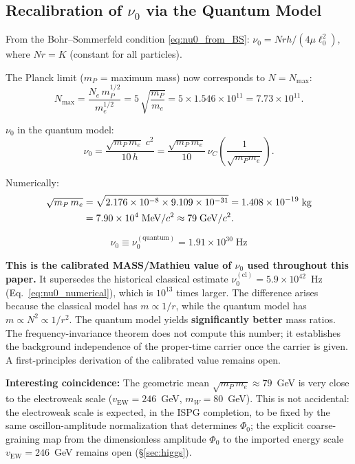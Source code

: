 \documentclass[11pt]{article}
\begin{document}
\subsection{Recalibration of $\nu_0$ via the Quantum Model}

From the Bohr--Sommerfeld condition
\eqref{eq:nu0_from_BS}: $\nu_0 = Nrh/(4\mu\ell_0^2)$,
where $Nr = K$ (constant for all particles).

The Planck limit ($m_P$ = maximum mass) now corresponds to
$N = N_{\max}$:
\begin{equation}
  N_{\max} = \frac{N_e\,m_P^{1/2}}{m_e^{1/2}}
  = 5\,\sqrt{\frac{m_P}{m_e}}
  = 5 \times 1.546 \times 10^{11}
  = 7.73 \times 10^{11}.
\end{equation}

$\nu_0$ in the quantum model:
\begin{equation}
  \nu_0
  = \frac{\sqrt{m_P\,m_e}\;c^2}{10\,h}
  = \frac{\sqrt{m_P\,m_e}}{10}\,\nu_C\!\left(
  \frac{1}{\sqrt{m_P m_e}}\right).
  \label{eq:nu0_quantum}
\end{equation}

Numerically:
\begin{align}
  \sqrt{m_P\,m_e}
  &= \sqrt{2.176 \times 10^{-8}
    \times 9.109 \times 10^{-31}}
  = 1.408 \times 10^{-19}\;\text{kg}
  \notag\\
  &= 7.90 \times 10^{4}\;\text{MeV}/c^2
  \approx 79\;\text{GeV}/c^2.
  \label{eq:geometric_mean_mass}
\end{align}

\begin{equation}
  \boxed{\nu_0
  \equiv \nu_0^{(\mathrm{quantum})}
  = 1.91 \times 10^{30}\;\mathrm{Hz}}
  \label{eq:nu0_quantum_value}
\end{equation}

\textbf{This is the calibrated MASS/Mathieu value of $\nu_0$ used
throughout this paper.}  It supersedes the historical classical
estimate $\nu_0^{(\mathrm{cl})} = 5.9 \times 10^{42}$~Hz
(Eq.~\ref{eq:nu0_numerical}), which is $10^{13}$ times
larger.  The difference arises because
the classical model has $m \propto 1/r$, while the quantum
model has $m \propto N^2 \propto 1/r^2$. The quantum model
yields \textbf{significantly better} mass ratios.  The
frequency-invariance theorem does not compute this number; it
establishes the background independence of the proper-time carrier
once the carrier is given.  A first-principles derivation of the
calibrated value remains open.

\medskip
\textbf{Interesting coincidence:}
The geometric mean $\sqrt{m_P\,m_e}
\approx 79$~GeV is very close to the electroweak scale
($v_{\mathrm{EW}} = 246$~GeV, $m_W = 80$~GeV).
This is not accidental: the electroweak scale is
expected, in the ISPG completion, to be fixed by the
same oscillon-amplitude normalization that determines
$\Phi_0$; the explicit coarse-graining map from the
dimensionless amplitude $\Phi_0$ to the imported energy
scale $v_{\mathrm{EW}}=246$~GeV remains open
(\S\ref{sec:higgs}).
\end{document}
